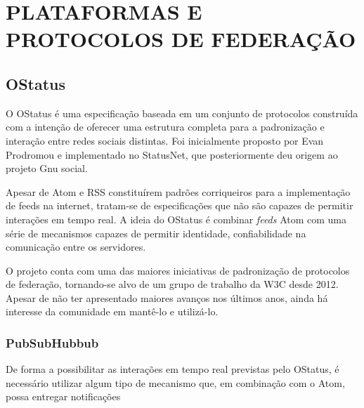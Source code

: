 

\chapter{PLATAFORMAS E PROTOCOLOS DE FEDERAÇÃO}




\section{OStatus}

O OStatus é uma especificação baseada em um conjunto de protocolos construída com a
intenção de oferecer uma estrutura completa para a padronização e interação entre 
redes sociais distintas. Foi inicialmente proposto por Evan Prodromou e implementado
no StatusNet, que posteriormente deu origem ao projeto Gnu social.

Apesar de Atom e RSS constituírem padrões corriqueiros para a implementação de feeds
na internet, tratam-se de especificações que não são capazes de permitir interações
em tempo real. A ideia do OStatus é combinar \textit{feeds} Atom com uma série de
mecanismos capazes de permitir identidade, confiabilidade na comunicação entre os
servidores.

O projeto conta com uma das maiores iniciativas de padronização de protocolos de
federação, tornando-se alvo de um grupo de trabalho da W3C desde 2012. Apesar de não
ter apresentado maiores avanços nos últimos anos, ainda há interesse da comunidade
em mantê-lo e utilizá-lo. 

\subsection{PubSubHubbub}

De forma a possibilitar as interações em tempo real previstas pelo  OStatus, é 
necessário utilizar algum tipo de mecanismo que, em combinação com o Atom, possa
entregar notificações 

